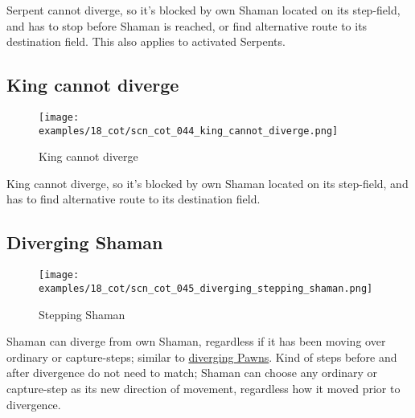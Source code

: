 \vspace*{-0.5\baselineskip}
Serpent cannot diverge, so it's blocked by own Shaman located on its step-field, and
has to stop before Shaman is reached, or find alternative route to its destination
field. This also applies to activated Serpents.


\subsection*{King cannot diverge}
\label{sec:Conquest of Tlalocan/Divergence/King cannot diverge}

\noindent
\begin{wrapfigure}[4]{l}{0.4\textwidth}
\centering
\texttt{[image: examples/18\_cot/scn\_cot\_044\_king\_cannot\_diverge.png]}
\caption{King cannot diverge}
\label{fig:scn_cot_044_king_cannot_diverge}
\end{wrapfigure}
King cannot diverge, so it's blocked by own Shaman located on its step-field,
and has to find alternative route to its destination field.

\clearpage %

\subsection*{Diverging Shaman}
\label{sec:Conquest of Tlalocan/Shaman/Movement/Diverging Shaman}

\vspace*{-0.7\baselineskip}
\noindent
\begin{wrapfigure}[10]{l}{0.4\textwidth}
\centering
\texttt{[image: examples/18\_cot/scn\_cot\_045\_diverging\_stepping\_shaman.png]}
\vspace*{-0.4\baselineskip}
\caption{Stepping Shaman}
\label{fig:scn_cot_045_diverging_stepping_shaman}
\end{wrapfigure}
Shaman can diverge from own Shaman, regardless if it has been moving over ordinary
or capture-steps; similar to
\hyperref[fig:scn_cot_034_diverging_pawn_init]{diverging Pawns}.\newline
\indent
Kind of steps before and after divergence do not need to match; Shaman can choose
any ordinary or capture-step as its new direction of movement, regardless how it
moved prior to divergence.

